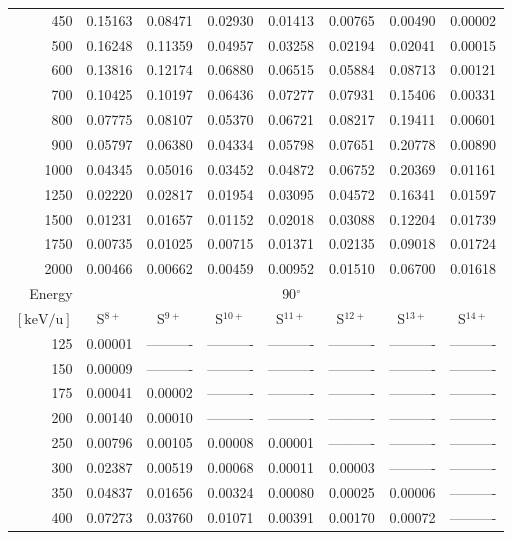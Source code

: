 \begin{table}[ht]
\begin{tabular}{r|c|c|c|c|c|c|c}
      450 & 0.15163 & 0.08471 & 0.02930 & 0.01413 & 0.00765 & 0.00490 & 0.00002 \\
      500 & 0.16248 & 0.11359 & 0.04957 & 0.03258 & 0.02194 & 0.02041 & 0.00015 \\
      600 & 0.13816 & 0.12174 & 0.06880 & 0.06515 & 0.05884 & 0.08713 & 0.00121 \\
      700 & 0.10425 & 0.10197 & 0.06436 & 0.07277 & 0.07931 & 0.15406 & 0.00331 \\
      800 & 0.07775 & 0.08107 & 0.05370 & 0.06721 & 0.08217 & 0.19411 & 0.00601 \\
      900 & 0.05797 & 0.06380 & 0.04334 & 0.05798 & 0.07651 & 0.20778 & 0.00890 \\
     1000 & 0.04345 & 0.05016 & 0.03452 & 0.04872 & 0.06752 & 0.20369 & 0.01161 \\
     1250 & 0.02220 & 0.02817 & 0.01954 & 0.03095 & 0.04572 & 0.16341 & 0.01597 \\
     1500 & 0.01231 & 0.01657 & 0.01152 & 0.02018 & 0.03088 & 0.12204 & 0.01739 \\
     1750 & 0.00735 & 0.01025 & 0.00715 & 0.01371 & 0.02135 & 0.09018 & 0.01724 \\
     2000 & 0.00466 & 0.00662 & 0.00459 & 0.00952 & 0.01510 & 0.06700 & 0.01618 \\ \cline{1-8}
    Energy & \multicolumn{7}{c}{90$^\circ$} \\ \cline{2-8}
    $\mathrm{[keV/u]}$ & S$^{8+}$ & S$^{9+}$ & S$^{10+}$ & S$^{11+}$ & S$^{12+}$ & S$^{13+}$ & S$^{14+}$ \\ \cline{1-8}
      125 & 0.00001 & ---------- & ---------- & ---------- & ---------- & ---------- & ---------- \\
      150 & 0.00009 & ---------- & ---------- & ---------- & ---------- & ---------- & ---------- \\
      175 & 0.00041 & 0.00002 & ---------- & ---------- & ---------- & ---------- & ---------- \\
      200 & 0.00140 & 0.00010 & ---------- & ---------- & ---------- & ---------- & ---------- \\
      250 & 0.00796 & 0.00105 & 0.00008 & 0.00001 & ---------- & ---------- & ---------- \\
      300 & 0.02387 & 0.00519 & 0.00068 & 0.00011 & 0.00003 & ---------- & ---------- \\
      350 & 0.04837 & 0.01656 & 0.00324 & 0.00080 & 0.00025 & 0.00006 & ---------- \\
      400 & 0.07273 & 0.03760 & 0.01071 & 0.00391 & 0.00170 & 0.00072 & ---------- \\

\end{tabular}
\end{table}

